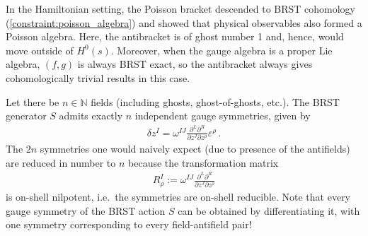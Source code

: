     \begin{remark}
        In the Hamiltonian setting, the Poisson bracket descended to BRST cohomology (\cref{constraint:poisson_algebra}) and showed that physical observables also formed a Poisson algebra. Here, the antibracket is of ghost number 1 and, hence, would move outside of $H^0(s)$. Moreover, when the gauge algebra is a proper Lie algebra, $(f,g)$ is always BRST exact, so the antibracket always gives cohomologically trivial results in this case.
    \end{remark}

    \begin{property}
        Let there be $n\in\mathbb{N}$ fields (including ghosts, ghost-of-ghosts, etc.). The BRST generator $S$ admits exactly $n$ independent gauge symmetries, given by
        \begin{gather}
            \delta z^I = \omega^{IJ}\frac{\partial^L\partial^R}{\partial z^J\partial z^\rho}\varepsilon^\rho\,.
        \end{gather}
        The $2n$ symmetries one would naively expect (due to presence of the antifields) are reduced in number to $n$ because the transformation matrix
        \begin{gather}
            R^I_\rho := \omega^{IJ}\frac{\partial^L\partial^R}{\partial z^J\partial z^\rho}
        \end{gather}
        is on-shell nilpotent, i.e.~the symmetries are on-shell reducible. Note that every gauge symmetry of the BRST action $S$ can be obtained by differentiating it, with one symmetry corresponding to every field-antifield pair!
    \end{property}

